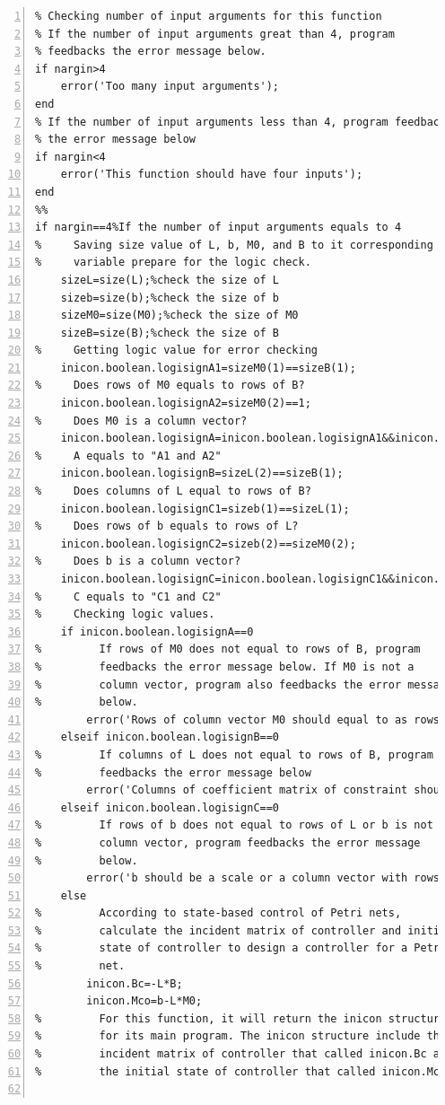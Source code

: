 \documentclass[11pt]{article}
\begin{document}
\begin{flushleft}
\begin{lstlisting}[numbers=left]
%%
% Checking number of input arguments for this function 
% If the number of input arguments great than 4, program
% feedbacks the error message below.
if nargin>4
    error('Too many input arguments');
end
% If the number of input arguments less than 4, program feedbacks
% the error message below
if nargin<4
    error('This function should have four inputs');
end
%%
if nargin==4%If the number of input arguments equals to 4
%     Saving size value of L, b, M0, and B to it corresponding
%     variable prepare for the logic check.
    sizeL=size(L);%check the size of L
    sizeb=size(b);%check the size of b
    sizeM0=size(M0);%check the size of M0
    sizeB=size(B);%check the size of B
%     Getting logic value for error checking
    inicon.boolean.logisignA1=sizeM0(1)==sizeB(1);
%     Does rows of M0 equals to rows of B?
    inicon.boolean.logisignA2=sizeM0(2)==1;
%     Does M0 is a column vector?
    inicon.boolean.logisignA=inicon.boolean.logisignA1&&inicon.boolean.logisignA2;
%     A equals to "A1 and A2"
    inicon.boolean.logisignB=sizeL(2)==sizeB(1);
%     Does columns of L equal to rows of B?
    inicon.boolean.logisignC1=sizeb(1)==sizeL(1);
%     Does rows of b equals to rows of L?
    inicon.boolean.logisignC2=sizeb(2)==sizeM0(2);
%     Does b is a column vector?
    inicon.boolean.logisignC=inicon.boolean.logisignC1&&inicon.boolean.logisignC2;
%     C equals to "C1 and C2" 
%     Checking logic values. 
    if inicon.boolean.logisignA==0
%         If rows of M0 does not equal to rows of B, program
%         feedbacks the error message below. If M0 is not a
%         column vector, program also feedbacks the error message
%         below.
        error('Rows of column vector M0 should equal to as rows of B')
    elseif inicon.boolean.logisignB==0
%         If columns of L does not equal to rows of B, program
%         feedbacks the error message below
        error('Columns of coefficient matrix of constraint should equal to rows of B')
    elseif inicon.boolean.logisignC==0
%         If rows of b does not equal to rows of L or b is not a
%         column vector, program feedbacks the error message
%         below.
        error('b should be a scale or a column vector with rows same as rows of L')
    else
%         According to state-based control of Petri nets,
%         calculate the incident matrix of controller and initial
%         state of controller to design a controller for a Petri
%         net.
        inicon.Bc=-L*B;
        inicon.Mco=b-L*M0;
%         For this function, it will return the inicon structure
%         for its main program. The inicon structure include the
%         incident matrix of controller that called inicon.Bc and
%         the initial state of controller that called inicon.Mco.
        

\end{lstlisting}
\end{flushleft}
\end{document}

